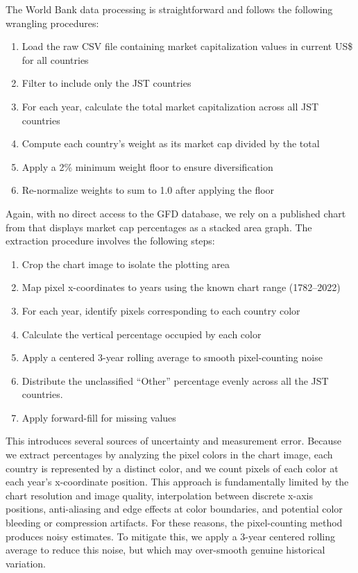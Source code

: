 \documentclass[11pt]{article}
\begin{document}
The World Bank data processing is straightforward and follows the following wrangling procedures:

\begin{enumerate}
    \item Load the raw CSV file containing market capitalization values in current US\$ for all countries
    \item Filter to include only the JST countries
    \item For each year, calculate the total market capitalization across all JST countries
    \item Compute each country's weight as its market cap divided by the total
    \item Apply a 2\% minimum weight floor to ensure diversification
    \item Re-normalize weights to sum to 1.0 after applying the floor
\end{enumerate}


Again, with no direct access to the GFD database, we rely on a published chart from \textcite{data__gfdMktCap} that displays market cap percentages as a stacked area graph. The extraction procedure involves the following steps:

\begin{enumerate}
    \item Crop the chart image to isolate the plotting area
    \item Map pixel x-coordinates to years using the known chart range (1782--2022)
    \item For each year, identify pixels corresponding to each country color
    \item Calculate the vertical percentage occupied by each color
    \item Apply a centered 3-year rolling average to smooth pixel-counting noise
    \item Distribute the unclassified ``Other'' percentage evenly across all the JST countries.
    \item Apply forward-fill for missing values
\end{enumerate}

This introduces several sources of uncertainty and measurement error. Because we extract percentages by analyzing the pixel colors in the chart image, each country is represented by a distinct color, and we count pixels of each color at each year's x-coordinate position. This approach is fundamentally limited by the chart resolution and image quality, interpolation between discrete x-axis positions, anti-aliasing and edge effects at color boundaries, and potential color bleeding or compression artifacts. For these reasons, the pixel-counting method produces noisy estimates. To mitigate this, we apply a 3-year centered rolling average to reduce this noise, but which may over-smooth genuine historical variation.
\end{document}
